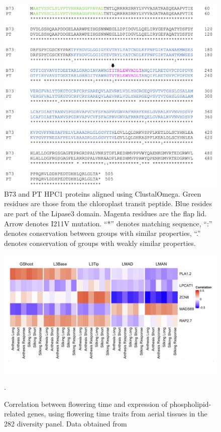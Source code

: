 \documentclass[9pt,twocolumn,twoside,lineno]{BioRxiv}
\begin{document}
\clearpage

\begin{figure}[t]
\begin{center}
\includegraphics[width=0.8\paperwidth]{Sup_Figures/Sup_Fig_7.png}
\caption{B73 and PT HPC1 proteins aligned using ClustalOmega. 
Green residues are those from the chloroplast transit peptide. Blue resides are part of the Lipase3 domain. 
Magenta residues are the flap lid. 
Arrow denotes I211V mutation. “*” denotes matching sequence, “:” denotes conservation between groups with similar properties, “.” denotes conservation of groups with weakly similar properties. 
}
\label{SupFig7}
\end{center}
\end{figure} 


\clearpage

\begin{figure}[t]
\begin{center}
\includegraphics[width=0.8 \paperwidth]{Sup_Figures/Sup_Fig_8.png}
\caption{Correlation between flowering time and expression of phospholipid-related genes, using flowering time traits from aerial tissues in the 282 diversity panel. 
Data obtained from \cite{Kremling2018-gn}}.
\label{SupFig8}
\end{center}
\end{figure} 

\clearpage
\end{document}
